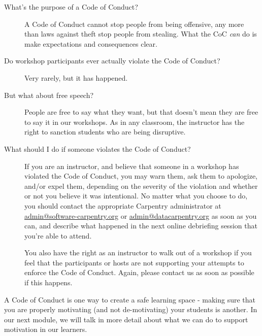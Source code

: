 \begin{description}
\item[What's the purpose of a Code of Conduct?] A Code of Conduct cannot stop people from being offensive, any more
than laws against theft stop people from stealing.  What the CoC
\emph{can} do is make expectations and consequences clear.



\item[Do workshop participants ever actually violate the Code of Conduct?] Very rarely, but it has happened.



\item[But what about free speech?] People are free to say what they want, but that doesn't mean they
are free to say it in our workshops.  As in any classroom, the
instructor has the right to sanction students who are being
disruptive.



\item[What should I do if someone violates the Code of Conduct?] If you are an instructor, and believe that someone in a workshop has
violated the Code of Conduct, you may warn them, ask them to
apologize, and/or expel them, depending on the severity of the
violation and whether or not you believe it was intentional.  No
matter what you choose to do, you should contact the appropriate
Carpentry administrator at
\href{mailto:admin@software-carpentry.org}{admin@software-carpentry.org}
or \href{mailto:admin@datacarpentry.org}{admin@datacarpentry.org} as
soon as you can, and describe what happened in the next online
debriefing session that you're able to attend.

You also have the right as an instructor to walk out of a workshop
if you feel that the participants or hosts are not supporting your
attempts to enforce the Code of Conduct.  Again, please contact us
as soon as possible if this happens.
\end{description}

A Code of Conduct is one way to create a safe learning space - making sure that 
you are properly motivating (and not de-motivating) your students is another.  In 
our next module, we will talk in more detail about what we can 
do to support motivation in our learners.

